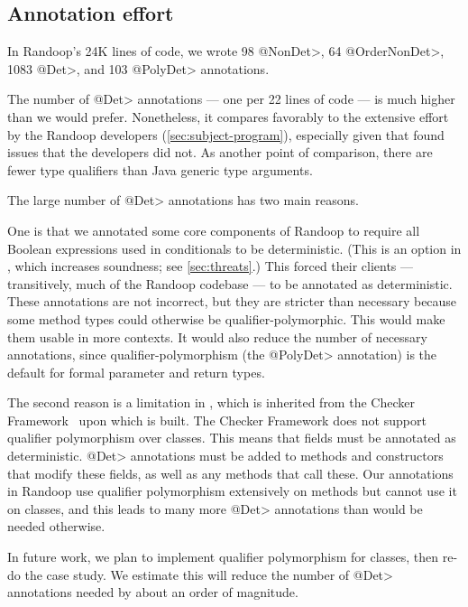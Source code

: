 \subsection{Annotation effort}

In Randoop's 24K lines of code, we wrote
98 \<@NonDet>,
64 \<@OrderNonDet>,
1083 \<@Det>,
and 103 \<@PolyDet> annotations.

The number of \<@Det> annotations --- one per 22 lines of code --- is much
higher than we would prefer.
Nonetheless, it compares favorably to the
extensive effort by the Randoop developers (\cref{sec:subject-program}),
especially given that \theDeterminismChecker found issues that the
developers did not.
As another point of comparison,
there are fewer type qualifiers than Java generic type arguments.

The large number of \<@Det> annotations has two main reasons.

One is that we annotated some core components of Randoop to require all
Boolean expressions used in conditionals to be deterministic.  (This is an
option in \theDeterminismCheckerImplementation, which increases soundness;
see \cref{sec:threats}.)  This forced
their clients --- transitively, much of the Randoop codebase --- to be
annotated as deterministic.
These annotations are not incorrect, but they are stricter than necessary
because some method types could otherwise be qualifier-polymorphic.
This would make them usable in more contexts.  It would also reduce the
number of necessary annotations, since qualifier-polymorphism (the
\<@PolyDet> annotation) is the default for
formal parameter and return types.

The second reason is a limitation in \theDeterminismCheckerImplementation,
which is inherited from the Checker Framework~\cite{checker-framework-tool} upon which
\theDeterminismChecker is built.
The Checker Framework does not support qualifier polymorphism over
classes.  This means that fields must be annotated as deterministic.
\<@Det> annotations must be added to methods and constructors that modify these
fields, as well as any methods that call these.
Our annotations in
Randoop use qualifier polymorphism extensively on methods but cannot use it
on classes, and this leads to many more \<@Det> annotations than would be
needed otherwise.

In future work, we plan to implement qualifier polymorphism for classes,
then re-do the case study.  We estimate this will reduce the number of
\<@Det> annotations needed by about an order of magnitude. 


